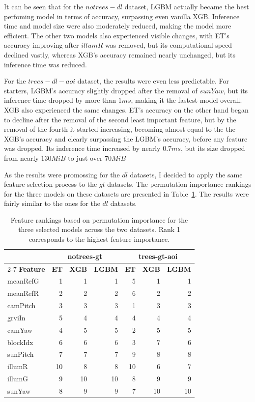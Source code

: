It can be seen that for the $notrees-dl$ dataset, LGBM actually became the best perfoming model in terms of accuracy, surpassing even vanilla XGB. Inference time and model size were also moderately reduced, making the model more efficient. The other two models also experienced visible changes, with ET's accuracy improving after $illumR$ was removed, but its computational speed declined vastly, whereas XGB's accuracy remained nearly unchanged, but its inference time was reduced.

For the $trees-dl-aoi$ dataset, the results were even less predictable. For starters, LGBM's accuracy slightly dropped after the removal of $sunYaw$, but its inference time dropped by more than $1ms$, making it the fastest model overall. XGB also experienced the same changes. ET's accuracy on the other hand began to decline after the removal of the second least important feature, but by the removal of the fourth it started increasing, becoming almost equal to the the XGB's accuracy and clearly surpassing the LGBM's accuracy, before any feature was dropped. Its inderence time increased by nearly $0.7ms$, but its size dropped from nearly $130MiB$ to just over $70MiB$ 

As the results were promossing for the $dl$ datasets, I decided to apply the same feature selection process to the $gt$ datasets. The permutation importance rankings for the three models on these datasets are presented in Table~\ref{permutation-importance-rankings-gt}. The results were fairly similar to the ones for the $dl$ datasets.

\begin{table}[htb]
\centering
\begin{tabular}{|l||r|r|r||r|r|r|}
\hline
& \multicolumn{3}{c||}{\textbf{notrees-gt}}
& \multicolumn{3}{c|}{\textbf{trees-gt-aoi}} \\
\cline{2-7}
\textbf{Feature} & \textbf{ET} & \textbf{XGB} & \textbf{LGBM}
                 & \textbf{ET} & \textbf{XGB} & \textbf{LGBM} \\
\hline\hline
meanRefG & 1  & 1  & 1  & 5  & 1  & 1  \\
\hline
meanRefR & 2  & 2  & 2  & 6  & 2  & 2  \\
\hline
camPitch & 3  & 3  & 3  & 1  & 3  & 3  \\
\hline
grviIn   & 5  & 4  & 4  & 4  & 4  & 4  \\
\hline
camYaw   & 4  & 5  & 5  & 2  & 5  & 5  \\
\hline
blockIdx & 6  & 6  & 6  & 3  & 7  & 6  \\
\hline
sunPitch & 7  & 7  & 7  & 9  & 8  & 8  \\
\hline
illumR   & 10 & 8  & 8  & 10 & 6  & 7  \\
\hline
illumG   & 9  & 10 & 10 & 8  & 9  & 9  \\
\hline
sunYaw   & 8  & 9  & 9  & 7  & 10 & 10 \\
\hline
\end{tabular}
\caption{Feature rankings based on permutation importance for the three
selected models across the two datasets. Rank 1 corresponds to the
highest feature importance.}
\label{permutation-importance-rankings-gt}
\end{table}

